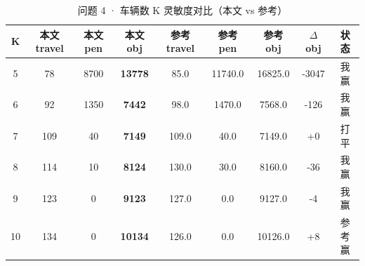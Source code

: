 \begin{table}[htbp]
\centering
\caption{问题 4 · 车辆数 K 灵敏度对比（本文 vs 参考）}\label{tab:q4_K_sens}
\small
\begin{tabular}{ccccccccc}
\toprule
K & 本文 travel & 本文 pen & \textbf{本文 obj} & 参考 travel & 参考 pen & 参考 obj & $\Delta$ obj & 状态 \\
\midrule
5 & 78 & 8700 & \textbf{13778} & 85.0 & 11740.0 & 16825.0 & -3047 & 我赢 \\
6 & 92 & 1350 & \textbf{7442} & 98.0 & 1470.0 & 7568.0 & -126 & 我赢 \\
7 & 109 & 40 & \textbf{7149} & 109.0 & 40.0 & 7149.0 & +0 & 打平 \\
8 & 114 & 10 & \textbf{8124} & 130.0 & 30.0 & 8160.0 & -36 & 我赢 \\
9 & 123 & 0 & \textbf{9123} & 127.0 & 0.0 & 9127.0 & -4 & 我赢 \\
10 & 134 & 0 & \textbf{10134} & 126.0 & 0.0 & 10126.0 & +8 & 参考赢 \\
\bottomrule
\end{tabular}
\end{table}
